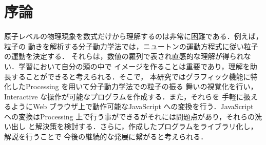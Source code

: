 \chapter{序論}\label{ux5e8fux8ad6}

    原子レベルの物理現象を数式だけから理解するのは非常に困難である．例えば，粒子の
動きを解析する分子動力学法では，ニュートンの運動方程式に従い粒子の運動を決定する．
それらは，数値の羅列で表され直感的な理解が得られない．学習において自分の頭の中で
イメージを作ることは重要であり，理解を助長することができると考えられる．そこで，
本研究ではグラフィック機能に特化したProcessing
を用いて分子動力学法での粒子の振る 舞いの視覚化を行い，Interactive
な操作が可能なプログラムを作成する．また，それらを 手軽に扱えるようにWeb
ブラウザ上で動作可能なJavaScript への変換を行う．JavaScript
への変換はProcessing
上で行う事ができるがそれには問題点があり，それらの洗い出し
と解決策を検討する．さらに，作成したプログラムをライブラリ化し，解説を行うことで
今後の継続的な発展に繋がると考えられる．

    